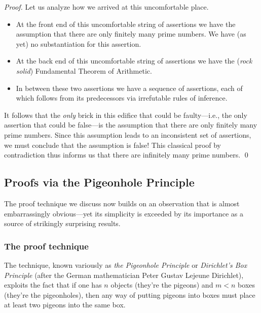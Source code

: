 \begin{proof}
\medskip

Let us analyze how we arrived at this uncomfortable place.
\begin{itemize}
\item
At the front end of this uncomfortable string of assertions we have the assumption that there are only finitely many prime numbers.  We have (as yet) no substantiation for this assertion.
\medskip\item
At the back end of this uncomfortable string of assertions we have the ({\em rock solid}) Fundamental Theorem of Arithmetic.
\medskip\item
In between these two assertions we have a sequence of assertions, each of which follows from its predecessors via irrefutable rules of inference.
\end{itemize}
It follows that the {\em only} brick in this edifice that could be faulty---i.e., the only assertion that could be false---is the assumption that there are only finitely many prime numbers.  Since this assumption leads to an inconsistent set of assertions, we must conclude that the assumption is false!  This classical proof by contradiction thus informs us that there are infinitely many prime numbers.  \qed
\end{proof}


\subsection{Proofs via the Pigeonhole Principle}
\label{sec:pigeonhole}

The proof technique we discuss now builds on an observation that is almost embarrassingly obvious---yet its simplicity is exceeded by its importance as a source of strikingly surprising results.

\subsubsection{The proof technique}

 

The technique, known variously as {\it the Pigeonhole Principle} or {\it Dirichlet's Box Principle}
(after the German mathematician Peter Gustav Lejeune Dirichlet), exploits the fact that if one has $n$ objects (they're the pigeons) and $m < n$ boxes (they're the pigeonholes), then any way of putting pigeons into boxes must place at least two pigeons into the same box.


